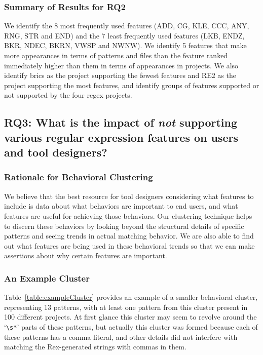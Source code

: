 

\subsubsection{Summary of Results for RQ2}
We identify the 8 most frequently used features (ADD, CG, KLE, CCC, ANY, RNG, STR and END) and the 7 least frequently used features (LKB, ENDZ, BKR, NDEC, BKRN, VWSP and NWNW).  We identify 5 features that make more appearances in terms of patterns and files than the feature ranked immediately higher than them in terms of appearances in projects.  We also identify brics as the project supporting the fewest features and RE2 as the project supporting the most features, and identify groups of features supported or not supported by the four regex projects.


\subsection{{RQ3:} What is the impact of \emph{not} supporting various regular expression features on users and tool designers?}
\label{results:rq3}

\subsubsection{Rationale for Behavioral Clustering}
We believe that the best resource for tool designers considering what features to include is data about what behaviors are important to end users, and what features are useful for achieving those behaviors.  Our clustering technique helps to discern these behaviors by looking beyond the structural details of specific patterns and seeing trends in actual matching behavior.  We are also able to find out what features are being used in these behavioral trends so that we can make assertions about why certain features are important.

\subsubsection{An Example Cluster}
Table~\ref{table:exampleCluster} provides an example of a smaller behavioral cluster, representing 13 patterns, with at least one pattern from this cluster present in 100 different projects.  At first glance this cluster may seem to revolve around the `\verb!\s*!' parts of these patterns, but actually this cluster was formed because each of these patterns has a comma literal, and other details did not interfere with matching the Rex-generated strings with commas in them.


